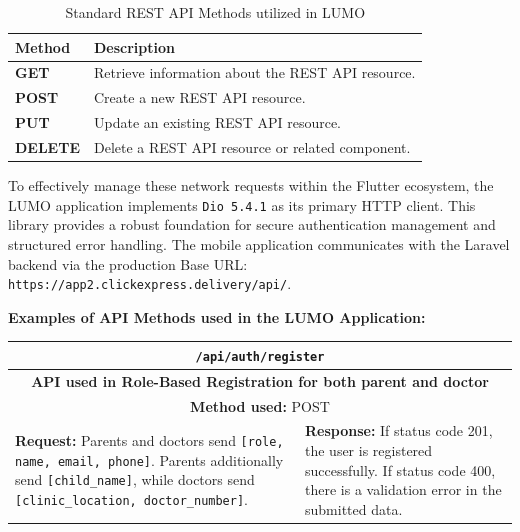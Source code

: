 \documentclass[12pt,a4paper]{report}
\begin{document}
\begin{table}[H]
    \centering
    \renewcommand{\arraystretch}{1.5}
    \caption{Standard REST API Methods utilized in LUMO}
    \label{tab:rest_methods}
    \begin{tabular}{|l|p{}|}
        \hline
        \textbf{Method} & \textbf{Description} \\
        \hline
        \textbf{GET} & Retrieve information about the REST API resource. \\
        \hline
        \textbf{POST} & Create a new REST API resource. \\
        \hline
        \textbf{PUT} & Update an existing REST API resource. \\
        \hline
        \textbf{DELETE} & Delete a REST API resource or related component. \\
        \hline
    \end{tabular}
\end{table}

To effectively manage these network requests within the Flutter ecosystem, the LUMO application implements \texttt{Dio 5.4.1} as its primary HTTP client. This library provides a robust foundation for secure authentication management and structured error handling. The mobile application communicates with the Laravel backend via the production Base URL: \texttt{https://app2.clickexpress.delivery/api/}.

\vspace{10pt}
\noindent\textbf{Examples of API Methods used in the LUMO Application:}
\vspace{5pt}

\begin{table}[H]
    \centering
    \renewcommand{\arraystretch}{1.5}
    \begin{tabular}{|p{}|p{}|}
        \hline
        \multicolumn{2}{|c|}{\texttt{/api/auth/register}} \\
        \hline
        \multicolumn{2}{|c|}{\textbf{API used in Role-Based Registration for both parent and doctor}} \\
        \hline
        \multicolumn{2}{|c|}{\textbf{Method used:} POST} \\
        \hline
        \textbf{Request:} Parents and doctors send \texttt{[role, name, email, phone]}. Parents additionally send \texttt{[child\_name]}, while doctors send \texttt{[clinic\_location, doctor\_number]}. & 
        \textbf{Response:} If status code 201, the user is registered successfully. If status code 400, there is a validation error in the submitted data. \\
        \hline
    \end{tabular}
\end{table}
\end{document}
